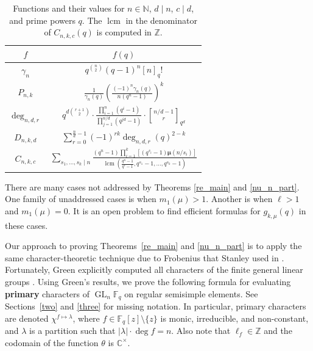 \documentclass[Unicode,ALCO]{cedram}
\DeclareMathOperator{\GL}{GL}
\DeclareMathOperator{\lcm}{lcm}
\newcommand{\Cbb}{\mathbb{C}}
\newcommand{\F}{\mathbb{F}}
\newcommand{\N}{\mathbb{N}}
\newcommand{\Z}{\mathbb{Z}}
\newcommand{\moebius}{\pmb{\mu}}
\newcommand{\myemph}{\textbf}
\newcommand{\te}{\theta}
\begin{document}
\begin{table}[ht]
\caption{Functions and their values for \(n \in \N\), \(d \mid n\), \(c \mid d\), and prime powers \(q\). The \(\lcm\) in the denominator of \(C_{n,k,c}(q)\) is computed in \(\Z\).}
\centering
\renewcommand{\arraystretch}{2}
\begin{tabular}{|c|c|}
\hline
\(f\) & \(f(q)\) \\
\hline
\(
\gamma_{n}\) & \(q^{\binom{n}{2}} (q-1)^n [n]_q!
\) \\
\(
P_{n,k}\) & \(
\frac{1}{\gamma_{n}(q)}
\left ( \frac{(-1)^n \gamma_n (q)}{n (q^n-1)} \right )^k
\) \\
\(
\deg_{n,d,r}\) & \(
q^{d \binom{r+1}{2}}
\cdot
\frac{\prod_{i=1}^n (q^i - 1)}{\prod_{j=1}^{n/d} (q^{jd} - 1)}
\cdot
{\genfrac[]{0pt}{1}{n/d - 1}{r}}_{q^d}
\) \\
\(
D_{n,k,d} \) & \(
\sum_{r = 0}^{\tfrac{n}{d} - 1}
(-1)^{rk} \deg_{n,d,r}(q)^{2-k}
\) \\
\(
C_{n,k,c}\) & \(
\sum_{s_1,\ldots,s_k \mid n}
\frac{(q^n-1)\prod_{i=1}^k \left [ (q^{s_i}-1) \moebius( n / s_i ) \right ]}{\lcm \left (
\tfrac{q^n-1}{q^c-1},
q^{s_1}-1,
\ldots,
q^{s_k}-1
\right ) }
\) \\
\hline
\end{tabular}
\label{formula_table}
\end{table}







\begin{remark}
There are many cases not addressed by Theorems \ref{re_main} and \ref{nu_n_part}.
One family of unaddressed cases is when \(m_1(\mu) > 1\).
Another is when \(\ell > 1\) and \(m_1(\mu) = 0\).
It is an open problem to find efficient formulas for \(g_{k,\mu} (q)\) in these cases.
\end{remark}











Our approach to proving Theorems~\ref{re_main} and \ref{nu_n_part} is to apply the same character-theoretic technique due to Frobenius that Stanley used in \cite{ncycle}.
Fortunately, Green explicitly computed all characters of the finite general linear groups \cite{green}.
Using Green's results, we prove the following formula for evaluating \myemph{primary} characters of \(\GL_n \F_q\) on regular semisimple elements.
See Sections~\ref{two} and \ref{three} for missing notation.
In particular,
primary characters are denoted \(\chi^{f \mapsto \lambda}\), where \(f \in \F_q [z] \setminus \{z\}\) is monic, irreducible, and non-constant, and \(\lambda\) is a partition such that \(|\lambda| \cdot \deg f = n\).
Also note that \(\ell_f \in \Z\) and the codomain of the function \(\te\) is \(\Cbb^\times\).
\end{document}
